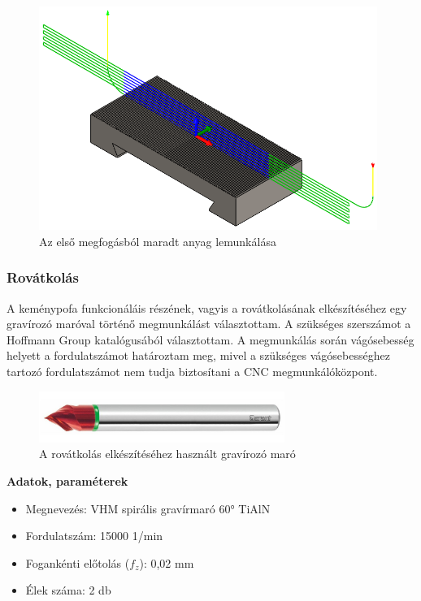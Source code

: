 \documentclass[12pt,a4paper,oneside]{report}
\begin{document}
\begin{figure}[H]
    \centering
    \includegraphics[width=11cm]{figures/kemenypofa_facemill_2.png}
    \caption{Az első megfogásból maradt anyag lemunkálása}
    \label{Fig:kemenypofa_facemill_2}
\end{figure}

\subsubsection{Rovátkolás}
A keménypofa funkcionáláis részének, vagyis a rovátkolásának elkészítéséhez egy gravírozó maróval történő megmunkálást választottam. A szükséges szerszámot a Hoffmann Group katalógusából választottam. A megmunkálás során vágósebesség helyett a fordulatszámot határoztam meg, mivel a szükséges vágósebességhez tartozó fordulatszámot nem tudja biztosítani a CNC megmunkálóközpont.

\begin{figure}[H]
    \centering
    \includegraphics[width=8cm]{figures/gravir.jpg}
    \caption{A rovátkolás elkészítéséhez használt gravírozó maró}
    \label{Fig:gravir}
\end{figure}

\textbf{Adatok, paraméterek}
\begin{itemize}
    \item Megnevezés: VHM spirális gravírmaró 60° TiAlN
    \item Fordulatszám: 15000 1/min
    \item Fogankénti előtolás ($f_z$): 0,02 mm
    \item Élek száma: 2 db
\end{itemize}
\end{document}
